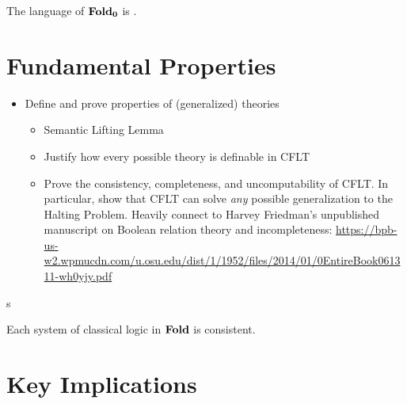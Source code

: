 \begin{definition}
The language of $\mathbf{Fold_0}$ is .
\end{definition}


\section{Fundamental Properties}
\begin{itemize}
  \item Define and prove properties of (generalized) theories
  \begin{itemize}
    \item Semantic Lifting Lemma
    \item Justify how every possible theory is definable in CFLT
    \item Prove the consistency, completeness, and uncomputability of CFLT. In particular, show that CFLT can solve \textit{any} possible generalization to the Halting Problem. Heavily connect to Harvey Friedman's unpublished manuscript on Boolean relation theory and incompleteness: \url{https://bpb-us-w2.wpmucdn.com/u.osu.edu/dist/1/1952/files/2014/01/0EntireBook061311-wh0yjy.pdf} \end{itemize}
\end{itemize}

s


\begin{theorem}
Each system of classical logic in $\mathbf{Fold}$ is consistent.
\end{theorem}

\section{Key Implications}
